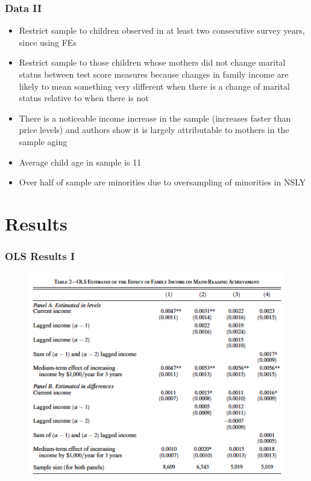 \documentclass{beamer}
\begin{document}
\begin{frame}
\frametitle{Data II}
\begin{itemize}
	\item Restrict sample to children observed in at least two consecutive survey years, since using FEs
	\item Restrict sample to those children whose mothers did not change marital status between test score measures because changes in family income are likely to mean something very different when there is a change of marital status relative to when there is not
	\item There is a noticeable income increase in the sample (increases faster than price levels) and authors show it is largely attributable to mothers in the sample aging
	\item Average child age in sample is 11
	\item Over half of sample are minorities due to oversampling of minorities in NSLY
\end{itemize}
\end{frame}


\section{Results}

\begin{frame}
\frametitle{OLS Results I}
	\begin{figure}
		\includegraphics[scale=0.5]{../Tables/table1} %
	\end{figure}
\end{frame}
\end{document}
